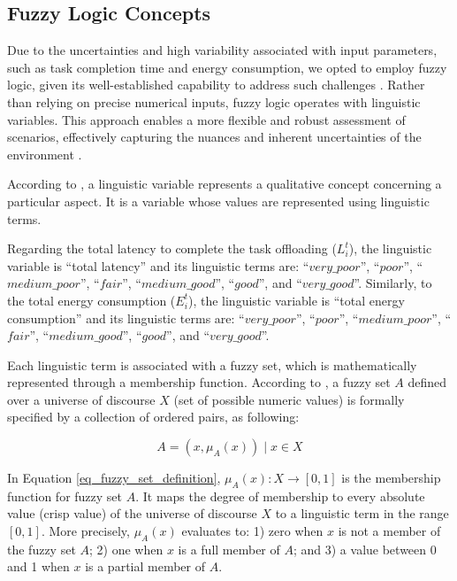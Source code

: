 \documentclass[iicol]{sn-jnl}
\begin{document}
\subsection{Fuzzy Logic Concepts}
Due to the uncertainties and high variability associated with input parameters, such as task completion time and energy consumption, we opted to employ fuzzy logic, given its well-established capability to address such challenges \cite{kahraman2008fuzzy}\cite{CHEN20001}. Rather than relying on precise numerical inputs, fuzzy logic operates with linguistic variables. This approach enables a more flexible and robust assessment of scenarios, effectively capturing the nuances and inherent uncertainties of the environment \cite{kahraman2008fuzzy}\cite{CHEN20001}.

According to \cite{zimmermann2011fuzzy}, a linguistic variable represents a qualitative concept concerning a particular aspect. It is a variable whose values are represented using linguistic terms. 

Regarding the total latency to complete the task offloading ($L_{i}^{t}$), the linguistic variable is ``total latency'' and its linguistic terms are: ``$very\_poor$'', ``$poor$'', ``$medium\_poor$'', ``$fair$'', ``$medium\_good$'', ``$good$'', and ``$very\_good$''. Similarly, to the total energy consumption ($E_{i}^{t}$), the linguistic variable is ``total energy consumption'' and its linguistic terms are: ``$very\_poor$'', ``$poor$'', ``$medium\_poor$'', ``$fair$'', ``$medium\_good$'', ``$good$'', and ``$very\_good$''.

Each linguistic term is associated with a fuzzy set, which is mathematically represented through a membership function. According to \cite{kaufmann1991introduction}, a fuzzy set $A$ defined over a universe of discourse $X$ (set of possible numeric values) is formally specified by a collection of ordered pairs, as following: 

\begin{equation}\label{eq_fuzzy_set_definition}
    A = {(x, \mu_A(x)) \mid x \in X }
\end{equation}

In Equation \eqref{eq_fuzzy_set_definition}, $\mu_A(x)\colon X \rightarrow [0, 1]$ is the membership function for fuzzy set $A$. It maps the degree of membership to every absolute value (crisp value) of the universe of discourse $X$ to a linguistic term in the range $[0, 1]$. More precisely, $\mu_A(x)$ evaluates to: 1) zero when $x$ is not a member of the fuzzy set $A$; 2) one when $x$ is a full member of $A$; and 3) a value between 0 and 1 when $x$ is a partial member of $A$.
\end{document}
